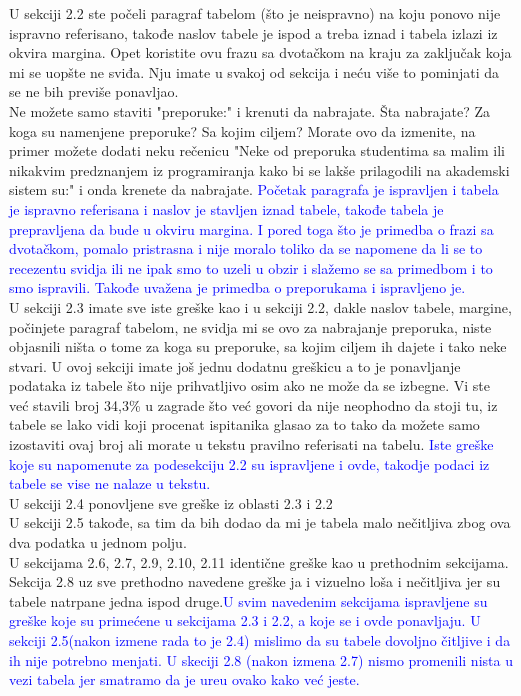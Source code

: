 \documentclass[a4paper]{report}
\newcommand{\odgovor}[1]{\textcolor{blue}{#1}}
\begin{document}
U sekciji 2.2 ste počeli paragraf tabelom (što je neispravno) na koju ponovo nije ispravno referisano, takođe naslov tabele je ispod a treba iznad i tabela izlazi iz okvira margina.
Opet koristite ovu frazu sa dvotačkom na kraju za zaključak koja mi se uopšte ne sviđa. Nju imate u svakoj od sekcija i neću više to pominjati da se ne bih previše ponavljao.\\
Ne možete samo staviti "preporuke:" i krenuti da nabrajate. Šta nabrajate? Za koga su namenjene preporuke? Sa kojim ciljem?
Morate ovo da izmenite, na primer možete dodati neku rečenicu "Neke od preporuka studentima sa malim ili nikakvim predznanjem iz programiranja kako bi se lakše prilagodili na akademski sistem su:" i onda krenete da nabrajate. \odgovor{Početak paragrafa je ispravljen i tabela je ispravno referisana i naslov je stavljen iznad tabele, takođe tabela je prepravljena da bude u okviru margina. I pored toga što je primedba o frazi sa dvotačkom, pomalo pristrasna i nije moralo toliko da se napomene da li se to recezentu svidja ili ne ipak smo to uzeli u obzir i slažemo se sa primedbom i to smo ispravili. Takođe uvažena je primedba o preporukama i ispravljeno je.} \\

U sekciji 2.3 imate sve iste greške kao i u sekciji 2.2, dakle naslov tabele, margine, počinjete paragraf tabelom, ne svidja mi se ovo za nabrajanje preporuka, niste objasnili ništa o tome za koga su preporuke, sa kojim ciljem ih dajete i tako neke stvari.
U ovoj sekciji imate još jednu dodatnu greškicu a to je ponavljanje podataka iz tabele što nije prihvatljivo osim ako ne može da se izbegne.
Vi ste već stavili broj 34,3\% u zagrade što već govori da nije neophodno da stoji tu, iz tabele se lako vidi koji procenat ispitanika glasao za to tako da možete samo izostaviti ovaj broj ali morate u tekstu pravilno referisati na tabelu. \odgovor{Iste greške koje su napomenute za podesekciju 2.2 su ispravljene i ovde, takodje podaci iz tabele se vise ne nalaze u tekstu.} \\

U sekciji 2.4 ponovljene sve greške iz oblasti 2.3 i 2.2\\
U sekciji 2.5 takođe, sa tim da bih dodao da mi je tabela malo nečitljiva zbog ova dva podatka u jednom polju. \\
U sekcijama 2.6, 2.7, 2.9, 2.10, 2.11 identične greške kao u prethodnim sekcijama.\\
Sekcija 2.8 uz sve prethodno navedene greške ja i vizuelno loša i nečitljiva jer su tabele natrpane jedna ispod druge.\odgovor{U svim navedenim sekcijama ispravljene su greške koje su primećene u sekcijama 2.3 i 2.2, a koje se i ovde ponavljaju. U sekciji 2.5(nakon izmene rada to je 2.4) mislimo da su tabele dovoljno čitljive i da ih nije potrebno menjati. U skeciji 2.8 (nakon izmena 2.7) nismo promenili nista u vezi tabela jer smatramo da je ureu ovako kako već jeste.} \\
\end{document}
